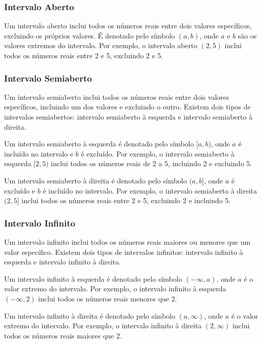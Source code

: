 \documentclass[12pt]{article}
\begin{document}
\subsubsection{Intervalo Aberto}

Um intervalo aberto inclui todos os números reais entre dois valores específicos, excluindo os próprios valores. É denotado pelo símbolo $(a, b)$, onde $a$ e $b$ são os valores extremos do intervalo. Por exemplo, o intervalo aberto $(2, 5)$ inclui todos os números reais entre 2 e 5, excluindo 2 e 5.

\subsubsection{Intervalo Semiaberto}

Um intervalo semiaberto inclui todos os números reais entre dois valores específicos, incluindo um dos valores e excluindo o outro. Existem dois tipos de intervalos semiabertos: intervalo semiaberto à esquerda e intervalo semiaberto à direita.

Um intervalo semiaberto à esquerda é denotado pelo símbolo $[a, b)$, onde $a$ é incluído no intervalo e $b$ é excluído. Por exemplo, o intervalo semiaberto à esquerda $[2, 5)$ inclui todos os números reais de 2 a 5, incluindo 2 e excluindo 5.

Um intervalo semiaberto à direita é denotado pelo símbolo $(a, b]$, onde $a$ é excluído e $b$ é incluído no intervalo. Por exemplo, o intervalo semiaberto à direita $(2, 5]$ inclui todos os números reais entre 2 e 5, excluindo 2 e incluindo 5.

\subsubsection{Intervalo Infinito}

Um intervalo infinito inclui todos os números reais maiores ou menores que um valor específico. Existem dois tipos de intervalos infinitos: intervalo infinito à esquerda e intervalo infinito à direita.

Um intervalo infinito à esquerda é denotado pelo símbolo $(-\infty, a)$, onde $a$ é o valor extremo do intervalo. Por exemplo, o intervalo infinito à esquerda $(-\infty, 2)$ inclui todos os números reais menores que 2.

Um intervalo infinito à direita é denotado pelo símbolo $(a, \infty)$, onde $a$ é o valor extremo do intervalo. Por exemplo, o intervalo infinito à direita $(2, \infty)$ inclui todos os números reais maiores que 2.
\end{document}
